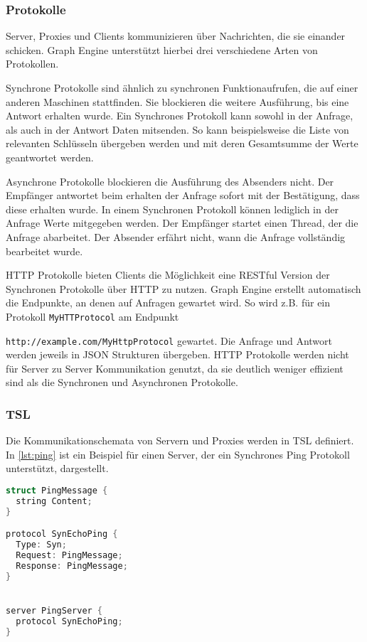 \subsubsection{Protokolle}

Server, Proxies und Clients kommunizieren über Nachrichten, die sie einander schicken. Graph Engine unterstützt hierbei drei verschiedene Arten von Protokollen.


Synchrone Protokolle sind ähnlich zu synchronen Funktionaufrufen, die auf einer anderen Maschinen stattfinden. Sie blockieren die weitere Ausführung, bis
eine Antwort erhalten wurde. Ein Synchrones Protokoll kann sowohl in der Anfrage, als auch in der Antwort Daten mitsenden. So kann beispielsweise die Liste von
relevanten Schlüsseln übergeben werden und mit deren Gesamtsumme der Werte geantwortet werden.


Asynchrone Protokolle blockieren die Ausführung des Absenders nicht. Der Empfänger antwortet beim erhalten der Anfrage sofort mit der Bestätigung, dass diese erhalten wurde.
In einem Synchronen Protokoll können lediglich in der Anfrage Werte mitgegeben werden.
Der Empfänger startet einen Thread, der die Anfrage abarbeitet. Der Absender erfährt nicht, wann die Anfrage vollständig bearbeitet wurde.


HTTP Protokolle bieten Clients die Möglichkeit eine RESTful Version der Synchronen Protokolle über HTTP zu nutzen. Graph Engine erstellt automatisch die Endpunkte, an denen
auf Anfragen gewartet wird. So wird z.B. für ein Protokoll \verb|MyHTTProtocol| am Endpunkt

\verb|http://example.com/MyHttpProtocol| gewartet. Die Anfrage und
Antwort werden jeweils in JSON Strukturen übergeben. HTTP Protokolle werden nicht für Server zu Server Kommunikation genutzt, da sie deutlich weniger effizient sind als die
Synchronen und Asynchronen Protokolle.

\subsubsection{TSL}

Die Kommunikationschemata von Servern und Proxies werden in TSL definiert. In \ref{lst:ping} ist ein Beispiel für einen Server, der ein Synchrones Ping Protokoll unterstützt, dargestellt.

\begin{lstlisting}[language=c,label={lst:ping}, caption={In TSL definiertes Ping Protokoll}]
struct PingMessage {
  string Content;
}

protocol SynEchoPing {
  Type: Syn;
  Request: PingMessage;
  Response: PingMessage;
}


server PingServer {
  protocol SynEchoPing;
}
\end{lstlisting}

